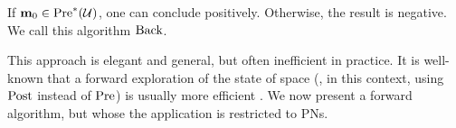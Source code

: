 If $\mathbf{m}_0 \in \operatorname{Pre}^*_{}(\mathcal{U})$, one can conclude positively.
Otherwise, the result is negative.
We call this algorithm $\operatorname{Back}$.

This approach is elegant and general, but often inefficient in practice.
It is well-known that a forward exploration of the state of space (\ie, in this context, using $\operatorname{Post}$ instead of $\operatorname{Pre}$) is usually more efficient \citep{Henzinger98}.
We now present a forward algorithm, but whose the application is restricted to \acp{PN}.
